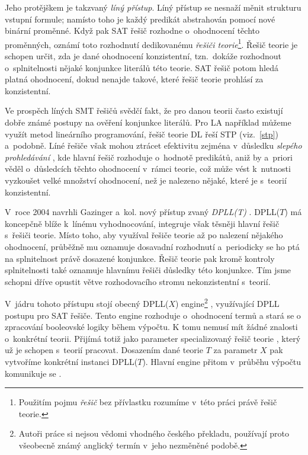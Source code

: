 Jeho protějškem je takzvaný \emph{líný přístup}. Líný přístup se nesnaží měnit strukturu vstupní formule; namísto toho je každý predikát abstrahován pomocí nové binární proměnné. Když pak SAT řešič rozhodne o~ohodnocení těchto proměnných, oznámí toto rozhodnutí dedikovanému \emph{řešiči teorie}\footnote{Použitím pojmu \emph{řešič} bez přívlastku rozumíme v~této práci právě řešič teorie.}. Řešič teorie je schopen určit, zda je dané ohodnocení konzistentní, tzn.~dokáže rozhodnout o~splnitelnosti nějaké konjunkce literálů této teorie. SAT řešič potom hledá platná ohodnocení, dokud nenajde takové, které řešič teorie prohlásí za konzistentní.

Ve prospěch líných SMT řešičů svědčí fakt, že pro danou teorii často existují dobře známé postupy na ověření konjunkce literálů. Pro LA například můžeme využít metod lineárního programování, řešič teorie DL řeší STP (viz.~\ref{stp}) a~podobně. Líné řešiče však mohou ztrácet efektivitu zejména v~důsledku \emph{slepého prohledávání} \cite{Moura04}, kde hlavní řešič rozhoduje o~hodnotě predikátů, aniž by a~priori věděl o~důsledcích těchto ohodnocení v~rámci teorie, což může vést k~nutnosti vyzkoušet velké množství ohodnocení, než je nalezeno nějaké, které je s~teorií konzistentní.

V~roce 2004 navrhli Gazinger a~kol. nový přístup zvaný \emph{DPLL(T)} \cite{Gazinger04}. DPLL($T$) má koncepčně blíže k~línému vyhodnocování, integruje však těsněji hlavní řešič s~řešiči teorie. Místo toho, aby využíval řešiče teorie až po nalezení nějakého ohodnocení, průběžně mu oznamuje dosavadní rozhodnutí a~periodicky se ho ptá na splnitelnost právě dosazené konjunkce. Řešič teorie pak kromě kontroly splnitelnosti také oznamuje hlavnímu řešiči důsledky této konjunkce. Tím jsme schopni dříve opustit větve rozhodovacího stromu nekonzistentní s~teorií. 

V~jádru tohoto přístupu stojí obecný DPLL($X$) engine\footnote{Autoři práce si nejsou vědomi vhodného českého překladu, používají proto všeobecně známý anglický termín v~jeho nezměněné podobě.} , využívající DPLL \cite{Davis60} postupu pro SAT řešiče. Tento engine rozhoduje o~ohodnocení termů a stará se o zpracování booleovské logiky během výpočtu. K tomu nemusí mít žádné znalosti o~konkrétní teorii. Přijímá totiž jako parameter specializovaný řešič teorie \Solver, který už je schopen s~teorií pracovat. Dosazením \Solver dané teorie $T$ za parametr $X$ pak vytvoříme konkrétní instanci DPLL($T$). Hlavní engine přitom v~průběhu výpočtu komunikuje se \Solver.

